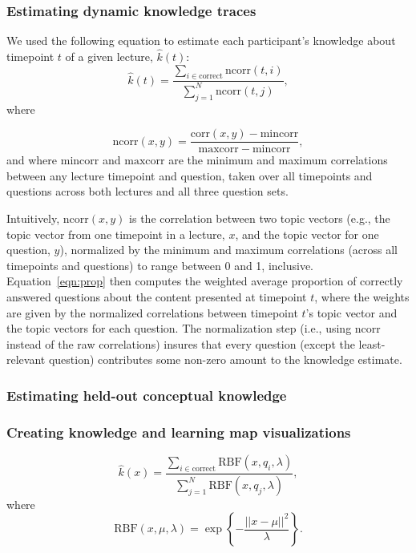 \documentclass[10pt]{article}
\begin{document}
\subsubsection*{Estimating dynamic knowledge traces}


We used the following equation to estimate each participant's knowledge about
timepoint $t$ of a given lecture, $\hat{k}(t)$:
\begin{equation} 
    \hat{k}(t) = \frac{\sum_{i \in \mathrm{correct}}\mathrm{ncorr}(t, i)}{\sum_{j = 1}^N \mathrm{ncorr}(t, j)},
    \label{eqn:prop}
\end{equation}
where 

\begin{equation} 
    \mathrm{ncorr}(x, y) = \frac{\mathrm{corr}(x, y) - \mathrm{mincorr}}{\mathrm{maxcorr} - \mathrm{mincorr}},
\end{equation} 
and where $\mathrm{mincorr}$ and $\mathrm{maxcorr}$ are the minimum and maximum
correlations between any lecture timepoint and question, taken over all
timepoints and questions across both lectures and all three question sets.

Intuitively, $\mathrm{ncorr}(x, y)$ is the correlation between two topic
vectors (e.g., the topic vector from one timepoint in a lecture, $x$, and the
topic vector for one question, $y$), normalized by the minimum and maximum
correlations (across all timepoints and questions) to range between 0 and 1,
inclusive. Equation~\ref{eqn:prop} then computes the weighted average
proportion of correctly answered questions about the content presented at
timepoint $t$, where the weights are given by the normalized correlations
between timepoint $t$'s topic vector and the topic vectors for each question.
The normalization step (i.e., using $\mathrm{ncorr}$ instead of the raw
correlations) insures that every question (except the least-relevant question)
contributes some non-zero amount to the knowledge estimate.

\subsubsection*{Estimating held-out conceptual knowledge}

\subsubsection*{Creating knowledge and learning map visualizations}

\begin{equation}
    \hat{k}(x) = \frac{\sum_{i \in \mathrm{correct}} \mathrm{RBF}(x, q_i, \lambda)}{\sum_{j = 1}^N \mathrm{RBF}(x, q_j, \lambda)},
\end{equation}
where
\begin{equation}
    \mathrm{RBF}(x, \mu, \lambda) = \exp\left\{-\frac{||x - \mu||^2}{\lambda}\right\}.
\end{equation}




\end{document}
